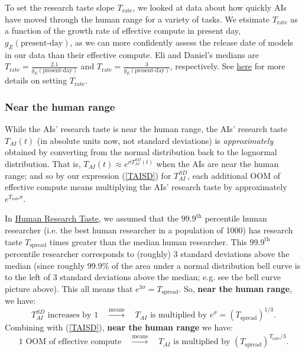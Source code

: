 \documentclass{article}
\theoremstyle{definition}
\begin{document}
To set the research taste slope $T_\text{rate}$, we looked at data about how quickly AIs have moved through the human range for a variety of tasks. We etsimate $T_\text{rate}$ as a function of the growth rate of effective compute in present day, $g_E(\text{present-day})$, as we can more confidently assess the release date of models in our data than their effective compute. Eli and Daniel's medians are $T_\text{rate} = \frac{2.1}{g_E(\text{present-day})}$ and $T_\text{rate} = \frac{3}{g_E(\text{present-day})}$, respectively. See \href{https://docs.google.com/document/d/1ru6Okbxb6XuH18Cz8439sdQJazMV39hNxsWDokh97r0/edit?tab=t.0#bookmark=kix.dkuwgjyzga9a}{here} for more details on setting $T_\text{rate}$.

\subsubsection{Near the human range}

While the AIs' research taste is near the human range, the AIs' research taste $T_{AI}(t)$ (in absolute units now, not standard deviations) is \textit{approximately} obtained by converting from the normal distribution back to the lognormal distribution. That is, $T_{AI}(t) \approx e^{\sigma T_{AI}^{SD}(t)}$ when the AIs are near the human range; and so by our expression (\ref{TAISD}) for $T_{AI}^{SD}$, each additional OOM of effective compute means multiplying the AIs' research taste by approximately $e^{T_\text{rate} \sigma}$.

In \hyperref[Human research taste]{Human Research Taste}, we assumed that the $99.9^\text{th}$ percentile human researcher (i.e. the best human researcher in a population of 1000) has research taste $T_\text{spread}$ times greater than the median human researcher. This $99.9^{\text{th}}$ percentile researcher corresponds to (roughly) 3 standard deviations above the median (since roughly $99.9\%$ of the area under a normal distribution bell curve is to the left of 3 standard deviations above the median; e.g. see the bell curve picture above). This all means that $e^{3 \sigma} = T_\text{spread}$. So, \textbf{near the human range}, we have:
\[ \text{$T_{AI}^{SD}$ increases by 1} \quad \xrightarrow{\text{means}} \quad \text{$T_{AI}$ is multiplied by $e^\sigma = \left(T_\text{spread}\right)^{1/3}$}.\]
Combining with (\ref{TAISD}), \textbf{near the human range} we have:
\[ \text{1 OOM of effective compute} \quad \xrightarrow{\text{means}} \quad \text{$T_{AI}$ is multiplied by $\left(T_\text{spread}\right)^{T_\text{rate}/3}$}.\]
\end{document}
